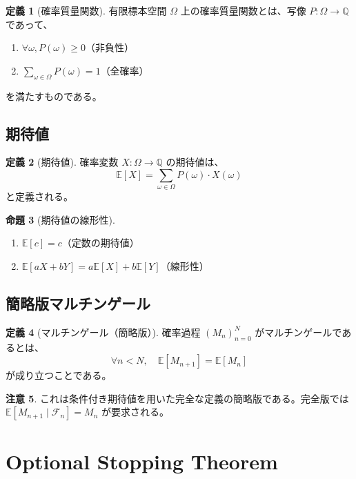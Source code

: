 \documentclass[a4paper,12pt]{ltjsarticle}
\theoremstyle{definition}
\newtheorem{definition}{定義}[section]
\newtheorem{proposition}[definition]{命題}
\newtheorem{remark}[definition]{注意}
\begin{document}
\begin{definition}[確率質量関数]
有限標本空間 $\Omega$ 上の確率質量関数とは、写像 $P : \Omega \to \mathbb{Q}$ であって、
\begin{enumerate}
\item $\forall \omega, P(\omega) \geq 0$（非負性）
\item $\sum_{\omega \in \Omega} P(\omega) = 1$（全確率）
\end{enumerate}
を満たすものである。
\end{definition}

\subsection{期待値}

\begin{definition}[期待値]
確率変数 $X : \Omega \to \mathbb{Q}$ の期待値は、
\[
\mathbb{E}[X] = \sum_{\omega \in \Omega} P(\omega) \cdot X(\omega)
\]
と定義される。
\end{definition}

\begin{proposition}[期待値の線形性]
\begin{enumerate}
\item $\mathbb{E}[c] = c$（定数の期待値）
\item $\mathbb{E}[aX + bY] = a\mathbb{E}[X] + b\mathbb{E}[Y]$（線形性）
\end{enumerate}
\end{proposition}

\subsection{簡略版マルチンゲール}

\begin{definition}[マルチンゲール（簡略版）]
確率過程 $(M_n)_{n=0}^N$ がマルチンゲールであるとは、
\[
\forall n < N, \quad \mathbb{E}[M_{n+1}] = \mathbb{E}[M_n]
\]
が成り立つことである。
\end{definition}

\begin{remark}
これは条件付き期待値を用いた完全な定義の簡略版である。完全版では $\mathbb{E}[M_{n+1} \mid \mathcal{F}_n] = M_n$ が要求される。
\end{remark}

\section{Optional Stopping Theorem}
\end{document}
